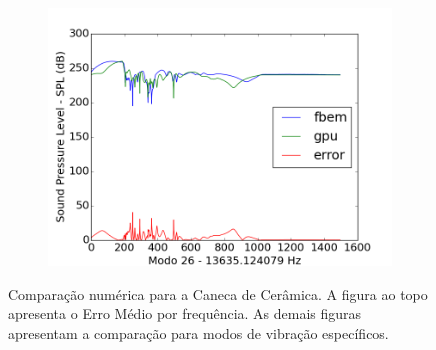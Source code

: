 \begin{figure}[ht]
\begin{subfigure}{0.45\textwidth}
	\includegraphics[width=\textwidth]{../data/transfer_test/ceramic_mug/plots/ceramic_mug-tfv-0_26.png}
	\caption{}
	\label{fig:coef_mug_26}
\end{subfigure}
\caption[Comparação numérica para a Caneca de Cerâmica]{Comparação numérica para a Caneca de Cerâmica. A figura ao topo apresenta o Erro Médio por frequência. As demais figuras apresentam a comparação para modos de vibração específicos.}
\label{fig:coef_mug}
\end{figure}

